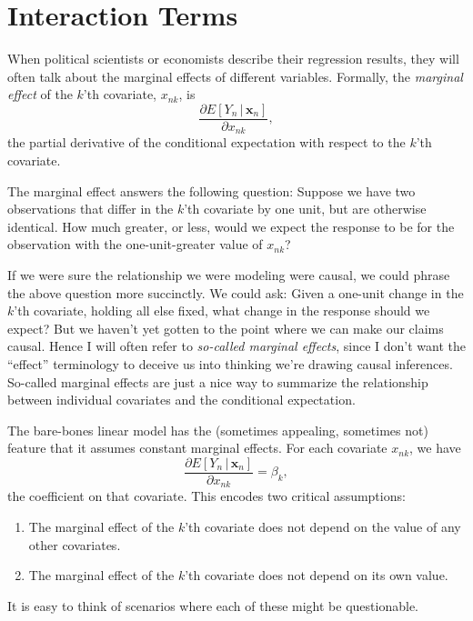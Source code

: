 \documentclass[
  12pt,
  oneside,openany]{book}
\begin{document}
\hypertarget{interaction-terms}{%
\section{Interaction Terms}\label{interaction-terms}}

When political scientists or economists describe their regression results, they will often talk about the marginal effects of different variables. Formally, the \emph{marginal effect} of the \(k\)'th covariate, \(x_{nk}\), is
\[
\frac{\partial{}E[Y_n \,|\, \mathbf{x}_n]}{\partial{}x_{nk}},
\]
the partial derivative of the conditional expectation with respect to the \(k\)'th covariate.

The marginal effect answers the following question: Suppose we have two observations that differ in the \(k\)'th covariate by one unit, but are otherwise identical. How much greater, or less, would we expect the response to be for the observation with the one-unit-greater value of \(x_{nk}\)?

If we were sure the relationship we were modeling were causal, we could phrase the above question more succinctly. We could ask: Given a one-unit change in the \(k\)'th covariate, holding all else fixed, what change in the response should we expect? But we haven't yet gotten to the point where we can make our claims causal. Hence I will often refer to \emph{so-called marginal effects}, since I don't want the ``effect'' terminology to deceive us into thinking we're drawing causal inferences. So-called marginal effects are just a nice way to summarize the relationship between individual covariates and the conditional expectation.

The bare-bones linear model has the (sometimes appealing, sometimes not) feature that it assumes constant marginal effects. For each covariate \(x_{nk}\), we have
\[
\frac{\partial{}E[Y_n \,|\, \mathbf{x}_n]}{\partial{}x_{nk}} = \beta_k,
\]
the coefficient on that covariate. This encodes two critical assumptions:

\begin{enumerate}
\def\labelenumi{\arabic{enumi}.}
\item
  The marginal effect of the \(k\)'th covariate does not depend on the value of any other covariates.
\item
  The marginal effect of the \(k\)'th covariate does not depend on its own value.
\end{enumerate}

It is easy to think of scenarios where each of these might be questionable.
\end{document}
